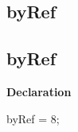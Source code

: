 \documentclass{report}
\newif\ifpdf
\begin{document}
\subsection*{\large{\textbf{byRef}}\normalsize\hspace{1ex}\hrulefill}
\else
\subsection*{byRef}
\fi
\label{WeirdRecord-byRef}
\begin{list}{}{
\setlength{\itemindent}{0cm}
\setlength{\listparindent}{0cm}
\setlength{\leftmargin}{\evensidemargin}
\addtolength{\leftmargin}{\tmplength}
\settowidth{\labelsep}{X}
\addtolength{\leftmargin}{\labelsep}
\setlength{\labelwidth}{\tmplength}
}
\item[\textbf{Declaration}\hfill]
\ifpdf
\begin{flushleft}
\fi
\begin{ttfamily}
byRef = 8;\end{ttfamily}

\ifpdf
\end{flushleft}
\fi

\end{list}
\end{document}

